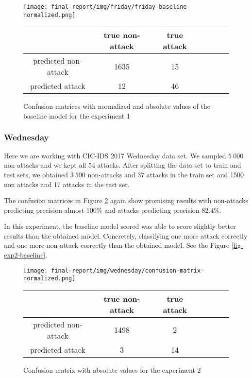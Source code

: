 \documentclass{article}
\begin{document}
\begin{figure}[h!]
    \centering
    \texttt{[image: final-report/img/friday/friday-baseline-normalized.png]}

    \centering
    \begin{tabular}{ |c|c|c|c|c|c|c| }
     \hline
      & true non-attack & true attack \\
     \hline
     predicted non-attack & 1635 & 15 \\
     \hline
     predicted attack & 12 & 46 \\
     \hline
    \end{tabular}
    \caption{Confusion matrices with normalized and absolute values of the baseline model for the experiment 1}
    \label{fig-exp1-baseline}
\end{figure}

\clearpage



\subsubsection{Wednesday}
Here we are working with CIC-IDS 2017 Wednesday data set. We sampled $5\ 000$ non-attacks and we kept all 54 attacks. After splitting the data set to train and test sets, we obtained $3\ 500$ non-attacks and 37 attacks in the train set and 1500 non attacks and 17 attacks in the test set.

The confusion matrices in Figure \ref{fig-exp2-transcriptions} again show promising results with non-attacks predicting precision almost $100\%$ and attacks predicting precision $82.4\%$.

In this experiment, the baseline model scored was able to score slightly better results than the obtained model. Concretely, classifying one more attack correctly and one more non-attack correctly than the obtained model. See the Figure \ref{fig-exp2-baseline}.

\begin{figure}[h!]
    \centering
    \texttt{[image: final-report/img/wednesday/confusion-matrix-normalized.png]}

    \centering
    \begin{tabular}{ |c|c|c|c|c|c|c| }
     \hline
      & true non-attack & true attack \\
     \hline
     predicted non-attack & 1498 & 2 \\
     \hline
     predicted attack & 3 & 14 \\
     \hline
    \end{tabular}
    \caption{Confusion matrix with absolute values for the experiment 2}
    \label{fig-exp2-transcriptions}
\end{figure}
\end{document}
